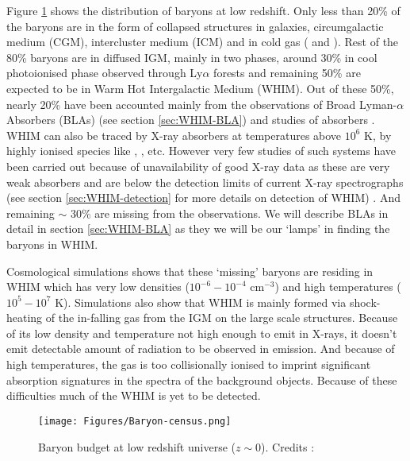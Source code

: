 Figure \ref{fig:Baryon-budget} shows the distribution of baryons at low redshift. Only less than 20\% of the baryons are in the form of collapsed structures in galaxies, circumgalactic medium (CGM), intercluster medium (ICM) and in cold gas ( and ). Rest of the 80\% baryons are in diffused IGM, mainly in two phases, around 30\% in cool photoionised phase observed through Ly$\alpha$ forests \citep{Danforth_2008,tilton_2012} and remaining 50\% are expected to be in Warm Hot Intergalactic Medium (WHIM). Out of these 50\%, nearly 20\% have been accounted mainly from the observations of Broad Lyman-$\alpha$ Absorbers (BLAs) (see section \ref{sec:WHIM-BLA}) and studies of  absorbers \citep{Danforth_2008,tilton_2012,Tripp_2008,savage-2014}. WHIM can also be traced by X-ray absorbers at temperatures above $10^6$ K, by highly ionised species like , , etc. However very few studies of such systems have been carried out because of unavailability of good X-ray data as these are very weak absorbers and are below the detection limits of current X-ray spectrographs \citep{yao_2012} (see section \ref{sec:WHIM-detection} for more details on detection of WHIM) . And remaining $\sim$ 30\% are missing from the observations. We will describe BLAs in detail in section \ref{sec:WHIM-BLA} as they we will be our `lamps' in finding the baryons in WHIM. 

Cosmological simulations \citep{cen-ostriker-1999,cen-ostriker-2006} shows that these `missing' baryons are residing in WHIM which has very low densities ($10^{-6}-10^{-4}$ cm$^{-3}$) and high temperatures ($10^5-10^7$ K). Simulations also show that WHIM is mainly formed via shock-heating of the in-falling gas from the IGM on the large scale structures. Because of its low density and temperature not high enough to emit in X-rays, it doesn't emit detectable amount of radiation to be observed in emission. And because of high temperatures, the gas is too collisionally ionised to imprint significant absorption signatures in the spectra of the background objects. Because of these difficulties much of the WHIM is yet to be detected. 

\begin{figure}[!t]
    \centering
    \vspace{5mm}
    \hspace{12mm}
    \texttt{[image: Figures/Baryon-census.png]}
    \caption{Baryon budget at low redshift universe ($z\sim0$). Credits : \citet{Shull}}
    \label{fig:Baryon-budget}
\end{figure}

